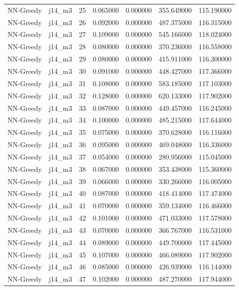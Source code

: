 \begin{tabular}{llrrrrr}
NN-Greedy & j14_m3 & 25 & 0.065000 & 0.000000 & 355.649000 & 115.190000 \\
NN-Greedy & j14_m3 & 26 & 0.092000 & 0.000000 & 487.375000 & 116.315000 \\
NN-Greedy & j14_m3 & 27 & 0.109000 & 0.000000 & 545.166000 & 118.024000 \\
NN-Greedy & j14_m3 & 28 & 0.080000 & 0.000000 & 370.236000 & 116.558000 \\
NN-Greedy & j14_m3 & 29 & 0.080000 & 0.000000 & 415.911000 & 116.300000 \\
NN-Greedy & j14_m3 & 30 & 0.091000 & 0.000000 & 448.427000 & 117.366000 \\
NN-Greedy & j14_m3 & 31 & 0.108000 & 0.000000 & 583.185000 & 117.103000 \\
NN-Greedy & j14_m3 & 32 & 0.128000 & 0.000000 & 620.133000 & 117.902000 \\
NN-Greedy & j14_m3 & 33 & 0.087000 & 0.000000 & 449.457000 & 116.245000 \\
NN-Greedy & j14_m3 & 34 & 0.100000 & 0.000000 & 485.215000 & 117.644000 \\
NN-Greedy & j14_m3 & 35 & 0.075000 & 0.000000 & 370.628000 & 116.116000 \\
NN-Greedy & j14_m3 & 36 & 0.095000 & 0.000000 & 469.048000 & 116.336000 \\
NN-Greedy & j14_m3 & 37 & 0.054000 & 0.000000 & 280.956000 & 115.045000 \\
NN-Greedy & j14_m3 & 38 & 0.067000 & 0.000000 & 353.438000 & 115.360000 \\
NN-Greedy & j14_m3 & 39 & 0.066000 & 0.000000 & 330.266000 & 116.005000 \\
NN-Greedy & j14_m3 & 40 & 0.087000 & 0.000000 & 418.414000 & 117.474000 \\
NN-Greedy & j14_m3 & 41 & 0.070000 & 0.000000 & 359.134000 & 116.466000 \\
NN-Greedy & j14_m3 & 42 & 0.101000 & 0.000000 & 471.033000 & 117.578000 \\
NN-Greedy & j14_m3 & 43 & 0.070000 & 0.000000 & 366.767000 & 116.531000 \\
NN-Greedy & j14_m3 & 44 & 0.089000 & 0.000000 & 449.700000 & 117.445000 \\
NN-Greedy & j14_m3 & 45 & 0.107000 & 0.000000 & 466.089000 & 117.902000 \\
NN-Greedy & j14_m3 & 46 & 0.085000 & 0.000000 & 426.939000 & 116.144000 \\
NN-Greedy & j14_m3 & 47 & 0.102000 & 0.000000 & 487.270000 & 117.944000 \\

\end{tabular}
